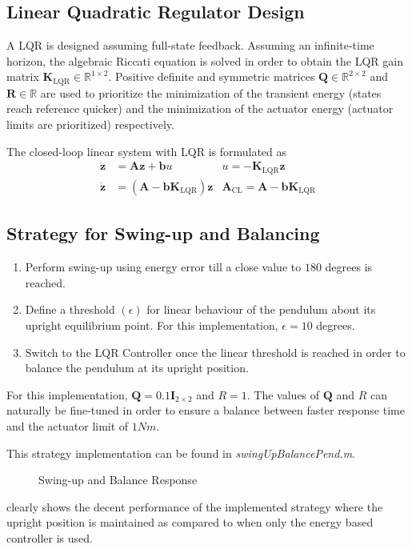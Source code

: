 \subsection{Linear Quadratic Regulator Design}
A LQR is designed assuming full-state feedback. Assuming an infinite-time horizon, the algebraic Riccati equation is solved in order to obtain the LQR gain matrix $\bm{K}_{\text{LQR}} \in \mathbb{R}^{1\times2}$. Positive definite and symmetric matrices $\bm{Q} \in \mathbb{R}^{2\times2}$ and $\bm{R} \in \mathbb{R}$ are used to prioritize the minimization of the transient energy (states reach reference quicker) and the minimization of the actuator energy (actuator limits are prioritized) respectively.

The closed-loop linear system with LQR is formulated as
\begin{align*}
	\dot{\bm{z}} &= \bm{A}\bm{z} + \bm{b}u & u = -\bm{K}_{\text{LQR}}\bm{z}\\
	\dot{\bm{z}} &= \left(\bm{A} - \bm{b} \bm{K}_{\text{LQR}}\right)\bm{z}  & \bm{A}_{\text{CL}} = \bm{A} - \bm{b} \bm{K}_{\text{LQR}}
\end{align*}

\subsection{Strategy for Swing-up and Balancing}
\begin{enumerate}
	\item Perform swing-up using energy error till a close value to $180$ degrees is reached.
	\item Define a threshold $\left(\epsilon\right)$ for linear behaviour of the pendulum about its upright equilibrium point. For this implementation, $\epsilon = 10$ degrees.
	\item Switch to the LQR Controller once the linear threshold is reached in order to balance the pendulum at its upright position.
\end{enumerate}

For this implementation, $\bm{Q} = 0.1\bm{I}_{2\times2}$ and $R = 1$. The values of $\bm{Q}$ and $R$ can naturally be fine-tuned in order to ensure a balance between faster response time and the actuator limit of $1 Nm$.

This strategy implementation can be found in \emph{swingUp\textunderscore Balance\textunderscore Pend.m}.

\begin{figure}[h!]
	\centering
	\scalebox{0.8}{}
	\caption{Swing-up and Balance Response}
	\label{fig:energyLQR}
\end{figure}
 clearly shows the decent performance of the implemented strategy where the upright position is maintained as compared to when only the energy based controller is used.